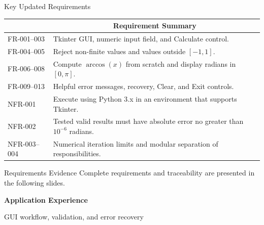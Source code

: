 \documentclass[aspectratio=169]{beamer}
\newcommand{\tableheader}[1]{%
    \multicolumn{1}{c}{\color{white}\textbf{#1}}%
}
\begin{document}
\begin{frame}{Key Updated Requirements}
\small
{}
\begin{tabular}{p{}p{}}
\rowcolor{navy}
\tableheader{ID} & \tableheader{Requirement Summary} \\
\toprule
FR-001--003 & Tkinter GUI, numeric input field, and Calculate control. \\
FR-004--005 & Reject non-finite values and values outside \([-1,1]\). \\
FR-006--008 & Compute \(\arccos(x)\) from scratch and display radians in \([0,\pi]\). \\
FR-009--013 & Helpful error messages, recovery, Clear, and Exit controls. \\
NFR-001 & Execute using Python 3.x in an environment that supports Tkinter. \\
NFR-002 & Tested valid results must have absolute error no greater than \(10^{-6}\) radians. \\
NFR-003--004 & Numerical iteration limits and modular separation of responsibilities. \\
\bottomrule
\end{tabular}

\vspace{0.28cm}

\begin{block}{Requirements Evidence}
Complete requirements and traceability are presented in the following slides.
\small\cite{project,iso29148}
\end{block}

\end{frame}

\begin{frame}[plain]
\centering
\vfill
{\color{navy}\LARGE\bfseries Application Experience\par}
\vspace{0.2cm}
{\large GUI workflow, validation, and error recovery\par}
\vfill
\end{frame}
\end{document}
